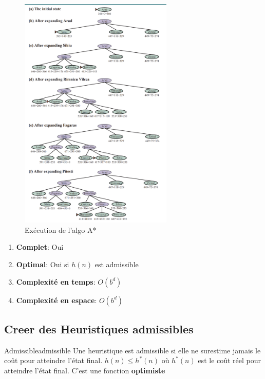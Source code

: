 \begin{figure}[H]
    \begin{center}
        \includegraphics[width=0.65\textwidth]{./pictures/astar.png}
    \end{center}
    \caption{Exécution de l'algo A*}\label{fig:astar}
\end{figure}

\begin{remarks}\leavevmode
    \begin{enumerate}
        \item \textbf{Complet}: Oui
        \item \textbf{Optimal}: Oui si $h(n)$ est admissible
        \item \textbf{Complexité en temps}: $O(b^d)$
        \item \textbf{Complexité en espace}: $O(b^d)$
    \end{enumerate}
\end{remarks}

\subsection{Creer des Heuristiques admissibles} %
\label{sub:creer_des_heuristiques_admissibles}

\begin{definition}{Admissible}{admissible}
    Une heuristique est admissible si elle ne surestime jamais le coût pour atteindre l'état final. 
    \begin{math}
        h(n) \leq h^*(n) 
    \end{math} 
    où $h^*(n)$ est le coût réel pour atteindre l'état final. 
    C'est une fonction \textbf{optimiste}
\end{definition}

